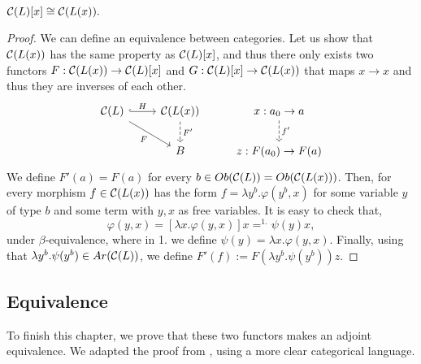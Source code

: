 \begin{proposition}
  $\mathcal{C}(L)[x] \cong \mathcal{C}(L(x)).$
\end{proposition}
\begin{proof}
  We can define an equivalence between categories. Let us show that $\mathcal{C}(L(x))$ has the same property as $\mathcal{C}(L)[x]$, and thus there only exists two functors $F:\mathcal{C}(L(x))\to \mathcal{C}(L)[x]$  and $G:\mathcal{C}(L)[x] \to\mathcal{C}(L(x))$ that maps $x\to x$ and thus they are inverses of each other.
  \[
  \begin{tikzcd}
    \CC(L)\arrow[hookrightarrow]{r}{H} \arrow[rd, "F", swap]      & \CC(L(x)) \arrow[d, "F'", dashed]& x:a_0\to a\arrow[d,"f'",dashed]\\
    &B& z:F(a_0)\to F(a) 
  \end{tikzcd}
\]
We define $F'(a) = F(a)$ for every $b\in Ob(\mathcal{C}(L))=Ob(\mathcal{C}(L(x)))$. Then, for every morphism $f \in \mathcal{C}(L(x))$ has the form $f = \lambda y^b. \varphi(y^b, x)$ for some variable $y$ of type $b$ and some term with $y,x$ as free variables. It is easy to check that, $$\varphi(y, x) = [\lambda x. \varphi(y,x ) ] x =^{1.} \psi(y)x,$$ under $\beta$-equivalence, where in 1. we define $\psi (y)= \lambda x. \varphi(y,x)$. Finally, using that $\lambda y^b. \psi(y^b) \in Ar(\mathcal{C}(L))$, we define $F'(f):= F(\lambda y^b. \psi(y^b)) z$.
\end{proof}
\subsection{Equivalence}
To finish this chapter, we prove that these two functors makes an adjoint equivalence. We adapted the proof from \cite[Theorem 11.3]{lambek1988introduction}, using a more clear categorical language. 


